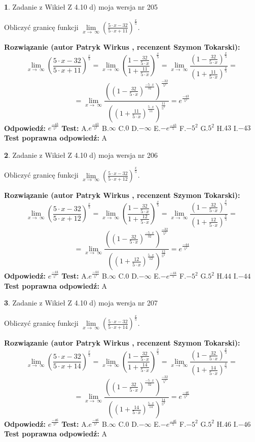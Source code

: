 \documentclass[12pt, a4paper]{article}
\theoremstyle{definition} %
\newtheorem{zad}{}
\newcommand{\zadStart}[1]{\begin{zad}#1\newline}
\newcommand{\zadStop}{\end{zad}}
\newcommand{\rozwStart}[2]{\noindent \textbf{Rozwiązanie (autor #1 , recenzent #2): }\newline}
\newcommand{\rozwStop}{\newline}
\newcommand{\odpStart}{\noindent \textbf{Odpowiedź:}\newline}
\newcommand{\odpStop}{\newline}
\newcommand{\testStart}{\noindent \textbf{Test:}\newline}
\newcommand{\testStop}{\newline}
\newcommand{\kluczStart}{\noindent \textbf{Test poprawna odpowiedź:}\newline}
\newcommand{\kluczStop}{\newline}
\begin{document}
\zadStart{Zadanie z Wikieł Z 4.10 d) moja wersja nr 205}


Obliczyć granicę funkcji  $\lim\limits_{x\to\ \infty}(\frac{5\cdot x-32}{5\cdot x+11})^{\frac{x}{5}}$.
\zadStop
\rozwStart{Patryk Wirkus}{Szymon Tokarski}
$$\lim\limits_{x\to\ \infty}(\frac{5\cdot x-32}{5\cdot x+11})^{\frac{x}{5}} = \lim\limits_{x\to\ \infty}(\frac{1-\frac{32}{5\cdot x}}{1+\frac{11}{5\cdot x}})^{\frac{x}{5}}=\lim\limits_{x\to\ \infty}\frac{(1-\frac{32}{5\cdot x})^{\frac{x}{5}}}{(1+\frac{11}{5\cdot x})^{\frac{x}{5}}}=$$
$$=\lim\limits_{x\to\ \infty}\frac{((1-\frac{32}{5\cdot x})^{\frac{-5\cdot x}{32}})^{\frac{-32}{5^{2}}}}{((1+\frac{11}{5\cdot x})^{\frac{5\cdot x}{11}})^{\frac{11}{5^{2}}}}=e^{\frac{-43}{5^{2}}}$$
\rozwStop
\odpStart
$e^{\frac{-43}{5^{2}}}$
\odpStop
\testStart
A.$e^{\frac{-43}{5^{2}}}$ B.$\infty$ C.$0$ D.$-\infty$ E.$-e^{\frac{-43}{5}}$
F.$-5^{2}$ G.$5^{2}$
H.$43$
I.$-43$
\testStop
\kluczStart
A
\kluczStop



\zadStart{Zadanie z Wikieł Z 4.10 d) moja wersja nr 206}


Obliczyć granicę funkcji  $\lim\limits_{x\to\ \infty}(\frac{5\cdot x-32}{5\cdot x+12})^{\frac{x}{5}}$.
\zadStop
\rozwStart{Patryk Wirkus}{Szymon Tokarski}
$$\lim\limits_{x\to\ \infty}(\frac{5\cdot x-32}{5\cdot x+12})^{\frac{x}{5}} = \lim\limits_{x\to\ \infty}(\frac{1-\frac{32}{5\cdot x}}{1+\frac{12}{5\cdot x}})^{\frac{x}{5}}=\lim\limits_{x\to\ \infty}\frac{(1-\frac{32}{5\cdot x})^{\frac{x}{5}}}{(1+\frac{12}{5\cdot x})^{\frac{x}{5}}}=$$
$$=\lim\limits_{x\to\ \infty}\frac{((1-\frac{32}{5\cdot x})^{\frac{-5\cdot x}{32}})^{\frac{-32}{5^{2}}}}{((1+\frac{12}{5\cdot x})^{\frac{5\cdot x}{12}})^{\frac{12}{5^{2}}}}=e^{\frac{-44}{5^{2}}}$$
\rozwStop
\odpStart
$e^{\frac{-44}{5^{2}}}$
\odpStop
\testStart
A.$e^{\frac{-44}{5^{2}}}$ B.$\infty$ C.$0$ D.$-\infty$ E.$-e^{\frac{-44}{5}}$
F.$-5^{2}$ G.$5^{2}$
H.$44$
I.$-44$
\testStop
\kluczStart
A
\kluczStop



\zadStart{Zadanie z Wikieł Z 4.10 d) moja wersja nr 207}


Obliczyć granicę funkcji  $\lim\limits_{x\to\ \infty}(\frac{5\cdot x-32}{5\cdot x+14})^{\frac{x}{5}}$.
\zadStop
\rozwStart{Patryk Wirkus}{Szymon Tokarski}
$$\lim\limits_{x\to\ \infty}(\frac{5\cdot x-32}{5\cdot x+14})^{\frac{x}{5}} = \lim\limits_{x\to\ \infty}(\frac{1-\frac{32}{5\cdot x}}{1+\frac{14}{5\cdot x}})^{\frac{x}{5}}=\lim\limits_{x\to\ \infty}\frac{(1-\frac{32}{5\cdot x})^{\frac{x}{5}}}{(1+\frac{14}{5\cdot x})^{\frac{x}{5}}}=$$
$$=\lim\limits_{x\to\ \infty}\frac{((1-\frac{32}{5\cdot x})^{\frac{-5\cdot x}{32}})^{\frac{-32}{5^{2}}}}{((1+\frac{14}{5\cdot x})^{\frac{5\cdot x}{14}})^{\frac{14}{5^{2}}}}=e^{\frac{-46}{5^{2}}}$$
\rozwStop
\odpStart
$e^{\frac{-46}{5^{2}}}$
\odpStop
\testStart
A.$e^{\frac{-46}{5^{2}}}$ B.$\infty$ C.$0$ D.$-\infty$ E.$-e^{\frac{-46}{5}}$
F.$-5^{2}$ G.$5^{2}$
H.$46$
I.$-46$
\testStop
\kluczStart
A
\kluczStop
\end{document}
